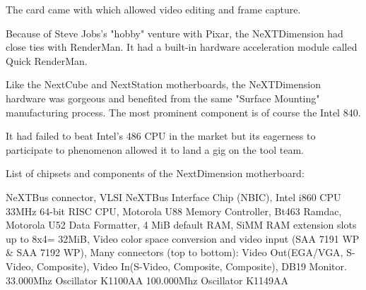 \par
\par
The card came with  which allowed video editing and frame capture.
\par
\vspace{5pt}
\par
Because of Steve Jobs's "hobby" venture with Pixar, the NeXTDimension had close ties with RenderMan. It had a built-in hardware acceleration module called Quick RenderMan.\\
\par
\par






\par
Like the NextCube and NextStation motherboards, the NeXTDimension hardware was gorgeous and benefited from the same "Surface Mounting" manufacturing process. The most prominent component is of course the Intel 840.\\
\par It had failed to beat Intel's 486 CPU in the market but its eagerness to participate to \doom{} phenomenon allowed it to land a gig on the tool team.\\
\par
{}
\par
{}
\par
List of chipsets and components of the NextDimension motherboard:\\
\par 
{} NeXTBus connector,
 VLSI NeXTBus Interface Chip (NBIC),
 Intel i860 CPU 33MHz 64-bit RISC CPU,
 Motorola U88 Memory Controller,
 Bt463 Ramdac,
 Motorola U52 Data Formatter,
 4 MiB default RAM,
 SiMM RAM extension slots up to 8x4= 32MiB,
 Video color space conversion and video input (SAA 7191 WP \& SAA 7192 WP), 
 Many connectors (top to bottom): Video Out(EGA/VGA, S-Video, Composite), Video In(S-Video, Composite, Composite), DB19 Monitor.
 33.000Mhz Oscillator K1100AA
 100.000Mhz Oscillator K1149AA
\par

